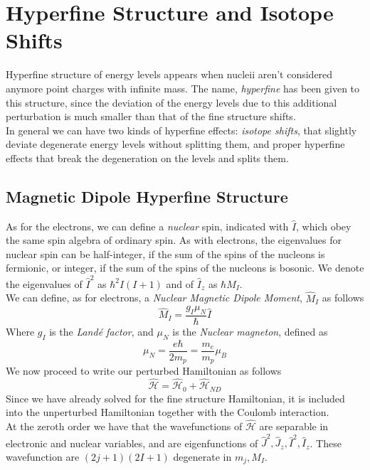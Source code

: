 \documentclass[a4paper, 11pt]{book}
\newcommand{\1}{\opr{\mathds{1}}}
\newcommand{\ham}{\mathcal{H}}
\newcommand{\opr}[1]{\hat{#1}}
\theoremstyle{plain}
\begin{document}
	\section{Hyperfine Structure and Isotope Shifts}
	Hyperfine structure of energy levels appears when nucleii aren't considered anymore point charges with infinite mass. The name, \textit{hyperfine} has been given to this structure, since the deviation of the energy levels due to this additional perturbation is much smaller than that of the fine structure shifts.\\
	In general we can have two kinds of hyperfine effects: \textit{isotope shifts}, that slightly deviate degenerate energy levels without splitting them, and proper hyperfine effects that break the degeneration on the levels and splits them.\\
	\subsection{Magnetic Dipole Hyperfine Structure}
	As for the electrons, we can define a \textit{nuclear} spin, indicated with $\opr{I}$, which obey the same spin algebra of ordinary spin. As with electrons, the eigenvalues for nuclear spin can be half-integer, if the sum of the spins of the nucleons is fermionic, or integer, if the sum of the spins of the nucleons is bosonic. We denote the eigenvalues of $\opr{I}^2$ as $\hbar^2I(I+1)$ and of $\opr{I}_z$ as $\hbar M_I$.\\
	We can define, as for electrons, a \textit{Nuclear Magnetic Dipole Moment}, $\opr{M}_I$ as follows
	\begin{equation}
		\opr{M}_I=\frac{g_I\mu_N}{\hbar}\opr{I}
		\label{eq:nucleardipolemoment}
	\end{equation}
	Where $g_I$ is the \textit{Landé factor}, and $\mu_N$ is the \textit{Nuclear magneton}, defined as
	\begin{equation}
		\mu_N=\frac{e\hbar}{2m_p}=\frac{m_e}{m_p}\mu_B
		\label{eq:nuclearmagneton}
	\end{equation}
	We now proceed to write our perturbed Hamiltonian as follows
	\begin{equation}
		\opr{\ham}=\opr{\ham}_0+\opr{\ham}_{ND}
		\label{eq:pertrel}
	\end{equation}
	Since we have already solved for the fine structure Hamiltonian, it is included into the unperturbed Hamiltonian together with the Coulomb interaction.\\
	At the zeroth order we have that the wavefunctions of $\opr{\ham}$ are separable in electronic and nuclear variables, and are eigenfunctions of $\opr{J}^2,\opr{J}_z,\opr{I}^2,\opr{I}_z$. These wavefunction are $(2j+1)(2I+1)$ degenerate in $m_j,M_I$.\\
\end{document}
